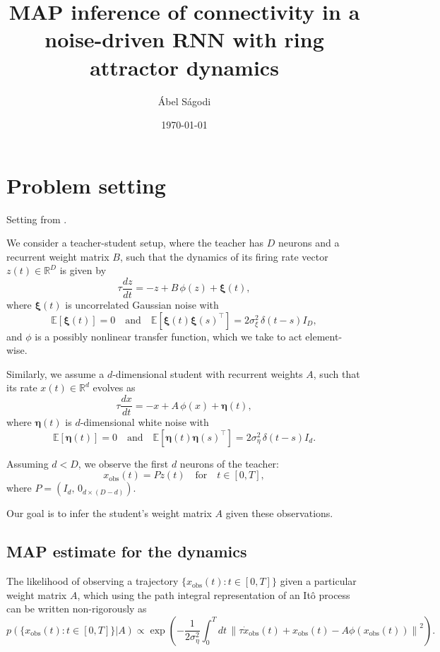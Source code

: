 \documentclass{article}
\title{MAP inference of connectivity in a noise-driven RNN with ring attractor dynamics}
\author{\'Abel S\'agodi}
\date{\today}
\theoremstyle{definition} \newtheorem{definition}{Definition}
\theoremstyle{remark} \newtheorem{remark}{Remark}
\newcounter{ct}
\begin{document}
\maketitle

\section{Problem setting}
Setting from \citep{qian2024partial}.

We consider a teacher-student setup, where the teacher has \( D \) neurons and a recurrent weight matrix \( B \), such that the dynamics of its firing rate vector \( z(t) \in \mathbb{R}^D \) is given by
\[
\tau \frac{d z}{dt} = -z + B \, \phi(z) + \boldsymbol{\xi}(t),
\]
where \( \boldsymbol{\xi}(t) \) is uncorrelated Gaussian noise with 
\[
\mathbb{E}[\boldsymbol{\xi}(t)] = 0 \quad \text{and} \quad \mathbb{E}[\boldsymbol{\xi}(t) \boldsymbol{\xi}(s)^\top] = 2 \sigma^2_{\xi} \, \delta(t - s) I_D,
\]
and \( \phi \) is a possibly nonlinear transfer function, which we take to act element-wise.



Similarly, we assume a \( d \)-dimensional student with recurrent weights \( A \), such that its rate \( x(t) \in \mathbb{R}^d \) evolves as
\[
\tau \frac{d x}{dt} = -x + A \, \phi(x) + \boldsymbol{\eta}(t),
\]
where \( \boldsymbol{\eta}(t) \) is \( d \)-dimensional white noise with
\[
\mathbb{E}[\boldsymbol{\eta}(t)] = 0 \quad \text{and} \quad \mathbb{E}[\boldsymbol{\eta}(t) \boldsymbol{\eta}(s)^\top] = 2 \sigma^2_{\eta} \, \delta(t - s) I_d.
\]

Assuming \( d < D \), we observe the first \( d \) neurons of the teacher:
\[
x_{\text{obs}}(t) = P z(t) \quad \text{for} \quad t \in [0, T],
\]
where \( P = (I_d, \, 0_{d \times (D - d)}) \).

Our goal is to infer the student’s weight matrix \( A \) given these observations.


\subsection{MAP estimate for the dynamics}

The likelihood of observing a trajectory \(\{x_{\text{obs}}(t) : t \in [0, T]\}\) given a particular weight matrix \( A \), which using the path integral representation of an Itô process can be written non-rigorously as  
\[
p(\{x_{\text{obs}}(t) : t \in [0, T]\} | A) \propto \exp \left( -\frac{1}{2\sigma^2_{\eta}} \int_0^T dt \, \left\| \tau \dot{x}_{\text{obs}}(t) + x_{\text{obs}}(t) - A \phi(x_{\text{obs}}(t)) \right\|^2 \right).
\]
\end{document}
